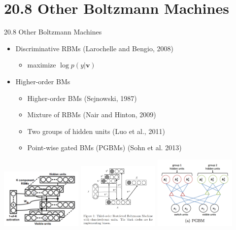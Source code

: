 \documentclass[dvipdfmx,presentation]{beamer}
\begin{document}
\section{20.8 Other Boltzmann Machines}
\label{sec:orgheadline7}
\begin{frame}[label={sec:orgheadline6}]{20.8 Other Boltzmann Machines}
\begin{itemize}
\item Discriminative RBMs (Larochelle and Bengio, 2008)
\begin{itemize}
\item maximize \(\log p(y | \mathbf{v})\)
\end{itemize}
\item Higher-order BMs
\begin{itemize}
\item Higher-order BMs (Sejnowski, 1987)
\item Mixture of RBMs (Nair and Hinton, 2009)
\item Two groups of hidden units (Luo et al., 2011)
\item Point-wise gated BMs (PGBMs) (Sohn et al. 2013)
\end{itemize}
\end{itemize}
\includegraphics[width=0.30\textwidth]{./figure/nair2009fig1b.png}
\includegraphics[width=0.30\textwidth]{./figure/luo2011fig1.png}
\includegraphics[width=0.30\textwidth]{./figure/sohn2013fig1a.png}
\end{frame}
\end{document}
